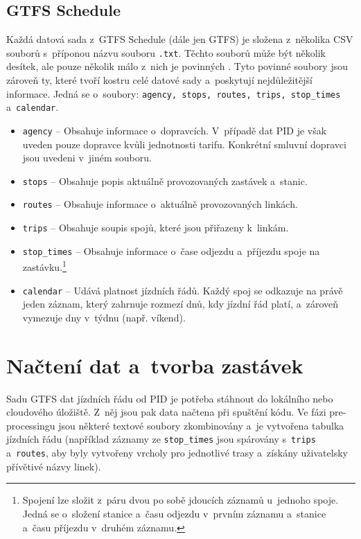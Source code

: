 \subsection{GTFS Schedule}
Každá datová sada z~GTFS Schedule (dále jen GTFS) je složena z~několika CSV souborů s~příponou názvu souboru \texttt{.txt}. Těchto souborů může být několik desítek, ale pouze několik málo z~nich je povinných \cite{gtfsDocumentation}. Tyto povinné soubory jsou zároveň ty, které tvoří kostru celé datové sady a~poskytují nejdůležitější informace. Jedná se o~soubory: \texttt{agency, stops, routes, trips, stop\_times} a~\texttt{calendar}.

\begin{itemize}
    \item{\texttt{agency} –  Obsahuje informace o~dopravcích. V~případě dat PID je však uveden pouze dopravce  kvůli jednotnosti tarifu. Konkrétní smluvní dopravci jsou uvedeni v~jiném souboru.}
    \item {\texttt{stops} – Obsahuje popis aktuálně provozovaných zastávek a~stanic.}
    \item {\texttt{routes} – Obsahuje informace o~aktuálně provozovaných linkách.}
    \item {\texttt{trips} – Obsahuje soupis spojů, které jsou přiřazeny k~linkám.}
    \item {\texttt{stop\_times} – Obsahuje informace o~čase odjezdu a~příjezdu spoje na zastávku.}\footnote{Spojení lze složit z~páru dvou po sobě jdoucích záznamů u~jednoho spoje. Jedná se o~složení stanice a~času odjezdu v~prvním záznamu a~stanice a~času příjezdu v~druhém záznamu.}
    \item {\texttt{calendar} – Udává platnost jízdních řádů. Každý spoj se odkazuje na právě jeden záznam, který zahrnuje rozmezí dnů, kdy jízdní řád platí, a~zároveň vymezuje dny v~týdnu (např. víkend).}
\end{itemize}
    
\section{Načtení dat a~tvorba zastávek}
Sadu GTFS dat jízdních řádu od PID je potřeba stáhnout do lokálního nebo cloudového úložiště. Z~něj jsou pak data načtena při spuštění kódu. Ve fázi pre-processingu jsou některé textové soubory zkombinovány a~je vytvořena tabulka jízdních řádu (například záznamy ze \texttt{stop\_times} jsou spárovány s~\texttt{trips} a~\texttt{routes}, aby byly vytvořeny vrcholy pro jednotlivé trasy a~získány uživatelsky přívětivé názvy linek). 

